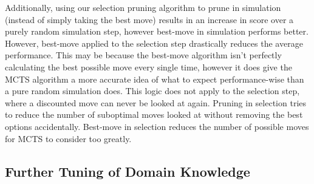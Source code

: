 \documentclass[letterpaper]{article}
\begin{document}
Additionally, using our selection pruning algorithm to prune in simulation (instead of simply taking the best move) results in an increase in score over a purely random simulation step, however best-move in simulation performs better. However, best-move applied to the selection step drastically reduces the average performance. This may be because the best-move algorithm isn't perfectly calculating the best possible move every single time, however it does give the MCTS algorithm a more accurate idea of what to expect performance-wise than a pure random simulation does. This logic does not apply to the selection step, where a discounted move can never be looked at again. Pruning in selection tries to reduce the number of suboptimal moves looked at without removing the best options accidentally. Best-move in selection reduces the number of possible moves for MCTS to consider too greatly.

\subsection{Further Tuning of Domain Knowledge}


\end{document}
